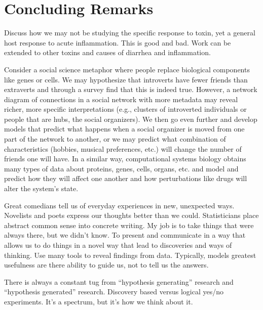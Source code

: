 \chapter{Concluding Remarks}

Discuss how we may not be studying the specific response to toxin,
yet a general host response to acute inflammation. This is good and 
bad. Work can be extended to other toxins and causes of
diarrhea and inflammation.




Consider a social science metaphor where people replace biological 
components like genes or cells. We may hypothesize that 
introverts have fewer friends than extraverts and through 
a survey find that this is indeed true. However, a network 
diagram of connections in a social network with more metadata 
may reveal richer, more specific interpretations (e.g., 
clusters of introverted individuals or people that are 
hubs, the social organizers). We then go even further 
and develop models that predict what happens when a 
social organizer is moved from one part of the network to 
another, or we may predict what combination of characteristics 
(hobbies, musical preferences, etc.) will change the number 
of friends one will have. In a similar way, computational 
systems biology obtains many types of data about proteins, 
genes, cells, organs, etc. and model and predict how they 
will affect one another and how perturbations like drugs 
will alter the system’s state.




Great comedians tell us of everyday experiences in new, 
unexpected ways. Novelists and poets express our thoughts 
better than we could. Statisticians place abstract common 
sense into concrete writing. My job is to take things that 
were always there, but we didn’t know. To present and 
communicate in a way that allows us to do things in a 
novel way that lead to discoveries and ways of thinking.  
Use many tools to reveal findings from data. Typically, 
models greatest usefulness are there ability to guide us, 
not to tell us the answers.


There is always a constant tug from “hypothesis generating” 
research and “hypothesis generated” research. Discovery 
based versus logical yes/no experiments. It’s a spectrum, 
but it’s how we think about it.


